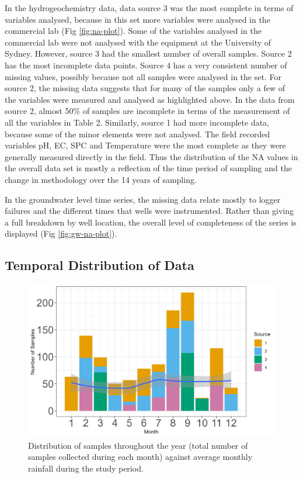 \documentclass[, manuscript]{copernicus}
\begin{document}
In the hydrogeochemistry data, data source 3 was the most complete in
terms of variables analysed, because in this set more variables were
analysed in the commercial lab (Fig \ref{fig:na-plot}). Some of the
variables analysed in the commercial lab were not analysed with the
equipment at the University of Sydney. However, source 3 had the
smallest number of overall samples. Source 2 has the most incomplete
data points. Source 4 has a very consistent number of missing values,
possibly because not all samples were analysed in the set. For source 2,
the missing data suggests that for many of the samples only a few of the
variables were measured and analysed as highlighted above. In the data
from source 2, almost 50\% of samples are incomplete in terms of the
measurement of all the variables in Table 2. Similarly, source 1 had
more incomplete data, because some of the minor elements were not
analysed. The field recorded variables pH, EC, SPC and Temperature were
the most complete as they were generally measured directly in the field.
Thus the distribution of the NA values in the overall data set is mostly
a reflection of the time period of sampling and the change in
methodology over the 14 years of sampling.

In the groundwater level time series, the missing data relate mostly to
logger failures and the different times that wells were instrumented.
Rather than giving a full breakdown by well location, the overall level
of completeness of the series is displayed (Fig \ref{fig:gw-na-plot}).

\subsection{Temporal Distribution of Data}

\clearpage

\begin{figure}
\includegraphics[width=0.5\linewidth]{Figures/monthly} \caption{Distribution of samples throughout the year (total number of samples collected during each month) against average monthly rainfall during the study period. }\label{fig:month-plot}
\end{figure}
\end{document}
